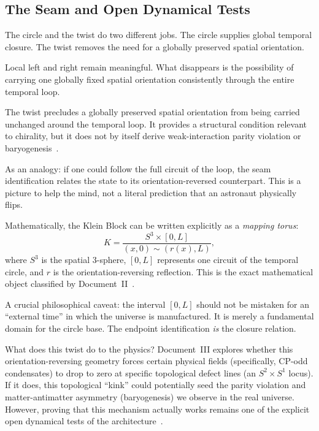 \documentclass[11pt]{article}
\theoremstyle{canonstyle}
\providecommand{\Klein}{\mathcal{K}}
\providecommand{\Sthree}{S^3}
\def\mathcal#1{#1}%
\begin{document}
\subsection{The Seam and Open Dynamical Tests}

The circle and the twist do two different jobs. The circle supplies global temporal closure. The twist removes the need for a globally preserved spatial orientation.

Local left and right remain meaningful. What disappears is the possibility of carrying one globally fixed spatial orientation consistently through the entire temporal loop.

The twist precludes a globally preserved spatial orientation from being carried unchanged around the temporal loop. It provides a structural condition relevant to chirality, but it does not by itself derive weak-interaction parity violation or baryogenesis~\cite{LeeYang,Wu,CanonHow}.

As an analogy: if one could follow the full circuit of the loop, the seam identification relates the state to its orientation-reversed counterpart. This is a picture to help the mind, not a literal prediction that an astronaut physically flips.

\begin{forthecurious}
Mathematically, the Klein Block can be written explicitly as a \textit{mapping torus}:
\[
\Klein = \frac{\Sthree \times [0,L]}{(x,0)\sim(r(x),L)},
\]
where $\Sthree$ is the spatial 3-sphere, $[0,L]$ represents one circuit of the temporal circle, and $r$ is the orientation-reversing reflection. This is the exact mathematical object classified by Document~II~\cite{CanonWhat}. 

\medskip

A crucial philosophical caveat: the interval $[0,L]$ should not be mistaken for an ``external time'' in which the universe is manufactured. It is merely a fundamental domain for the circle base. The endpoint identification \emph{is} the closure relation.

\medskip

What does this twist do to the physics? Document~III explores whether this orientation-reversing geometry forces certain physical fields (specifically, CP-odd condensates) to drop to zero at specific topological defect lines (an $S^2 \times S^1$ locus). If it does, this topological ``kink'' could potentially seed the parity violation and matter-antimatter asymmetry (baryogenesis) we observe in the real universe. However, proving that this mechanism actually works remains one of the explicit open dynamical tests of the architecture~\cite{CanonHow}.
\end{forthecurious}
\end{document}

